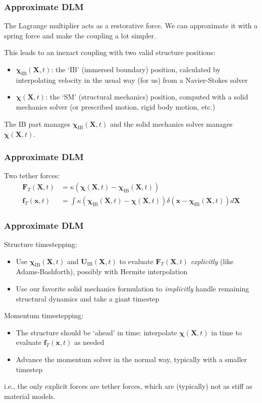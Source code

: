 \documentclass[8pt]{beamer}
\newcommand{\Chib}{\boldsymbol{\chi}}
\newcommand{\xb}{\boldsymbol{x}}
\newcommand{\Xb}{\boldsymbol{X}}
\newcommand{\fb}{\boldsymbol{f}}
\newcommand{\Fb}{\boldsymbol{F}}
\newcommand{\Ub}{\boldsymbol{U}}
\begin{document}
\begin{frame}
  \frametitle{Approximate DLM}

  The Lagrange multiplier acts as a restorative force. We can approximate it
  with a spring force and make the coupling a lot simpler.

  This leads to an inexact coupling with two valid structure positions:
  \begin{itemize}
    \item $\Chib_\text{IB}(\Xb, t)$: the `IB' (immersed boundary) position,
      calculated by interpolating velocity in the usual way (for us) from a
      Navier-Stokes solver
    \item $\Chib(\Xb, t)$: the `SM' (structural mechanics) position, computed
      with a solid mechanics solver (or prescribed motion, rigid body motion, etc.)
  \end{itemize}

  The IB part manages $\Chib_\text{IB}(\Xb, t)$ and the solid mechanics solver manages $\Chib(\Xb, t)$.
\end{frame}

\begin{frame}
  \frametitle{Approximate DLM}

  Two tether forces:
  \begin{align}
    \Fb_T(\Xb, t) &= \kappa (\Chib(\Xb, t) - \Chib_\text{IB}(\Xb, t)) \\
    \fb_T(\xb, t) &=
    \int \kappa (\Chib_\text{IB}(\Xb, t) - \Chib(\Xb, t)) \delta(\xb - \Chib_\text{IB}(\Xb, t)) d\Xb
  \end{align}
\end{frame}

\begin{frame}
  \frametitle{Approximate DLM}
  Structure timestepping:
  \begin{itemize}
    \item Use $\Chib_\text{IB}(\Xb, t)$ and $\Ub_\text{IB}(\Xb, t)$ to evaluate
      $\Fb_T(\Xb, t)$ \emph{explicitly} (like Adams-Bashforth), possibly with
      Hermite interpolation
    \item Use our favorite solid mechanics formulation to \emph{implicitly}
      handle remaining structural dynamics and take a giant timestep
  \end{itemize}

  Momentum timestepping:
  \begin{itemize}
    \item The structure should be `ahead' in time: interpolate $\Chib(\Xb, t)$
      in time to evaluate $\fb_T(\xb, t)$ as needed
    \item Advance the momentum solver in the normal way, typically with a
      smaller timestep
  \end{itemize}
  i.e., the only explicit forces are tether forces, which are (typically) not as
  stiff as material models.
\end{frame}
\end{document}
